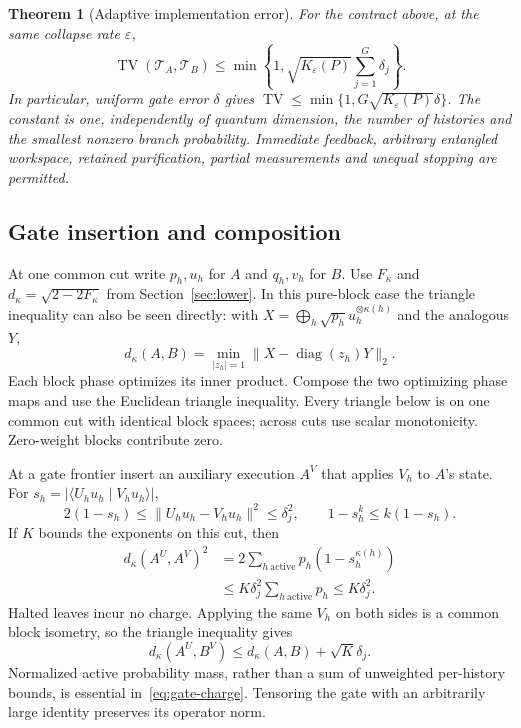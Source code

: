 \documentclass[11pt]{article}
\newtheorem{theorem}{Theorem}
\theoremstyle{remark}
\newcommand{\eps}{\varepsilon}
\newcommand{\ip}[2]{\langle #1\mid #2\rangle}
\begin{document}
\begin{theorem}[Adaptive implementation error]\label{thm:precision}
For the contract above, at the same collapse rate $\eps$,
\begin{equation}\label{eq:precision-main}
 \operatorname{TV}(\mathcal T_A,\mathcal T_B)
 \le\min\left\{1,\sqrt{K_\eps(P)}\sum_{j=1}^G\delta_j\right\}.
\end{equation}
In particular, uniform gate error $\delta$ gives
$\operatorname{TV}\le\min\{1,G\sqrt{K_\eps(P)}\delta\}$.
The constant is one, independently of quantum dimension, the number of
histories and the smallest nonzero branch probability. Immediate feedback,
arbitrary entangled workspace, retained purification, partial measurements
and unequal stopping are permitted.
\end{theorem}

\subsection{Gate insertion and composition}
At one common cut write $p_h,u_h$ for $A$ and $q_h,v_h$ for $B$.
Use $F_\kappa$ and $d_\kappa=\sqrt{2-2F_\kappa}$ from
Section~\ref{sec:lower}. In this pure-block case the triangle inequality
can also be seen directly: with
$X=\bigoplus_h\sqrt{p_h}u_h^{\otimes\kappa(h)}$ and the analogous $Y$,
\[
 d_\kappa(A,B)=\min_{|z_h|=1}
       \|X-\operatorname{diag}(z_h)Y\|_2.
\]
Each block phase optimizes its inner product. Compose the two optimizing
phase maps and use the Euclidean triangle inequality. Every triangle below
is on one common cut with identical block spaces; across cuts use scalar
monotonicity. Zero-weight blocks contribute zero.

At a gate frontier insert an auxiliary execution $A^V$ that applies $V_h$
to $A$'s state. For $s_h=|\ip{U_hu_h}{V_hu_h}|$,
\[
 2(1-s_h)\le\|U_hu_h-V_hu_h\|^2\le\delta_j^2,
 \qquad 1-s_h^k\le k(1-s_h).
\]
If $K$ bounds the exponents on this cut, then
\begin{equation}\label{eq:gate-charge}
 \begin{split}
 d_\kappa(A^U,A^V)^2
 &=2\sum_{h\ \mathrm{active}}p_h(1-s_h^{\kappa(h)})\\
 &\le K\delta_j^2\sum_{h\ \mathrm{active}}p_h
 \le K\delta_j^2.
 \end{split}
\end{equation}
Halted leaves incur no charge. Applying the same $V_h$ on both sides is
a common block isometry, so the triangle inequality gives
\begin{equation}\label{eq:gate-insertion}
 d_\kappa(A^U,B^V)
 \le d_\kappa(A,B)+\sqrt K\delta_j.
\end{equation}
Normalized active probability mass, rather than a sum of unweighted
per-history bounds, is essential in~\eqref{eq:gate-charge}. Tensoring the
gate with an arbitrarily large identity preserves its operator norm.
\end{document}
